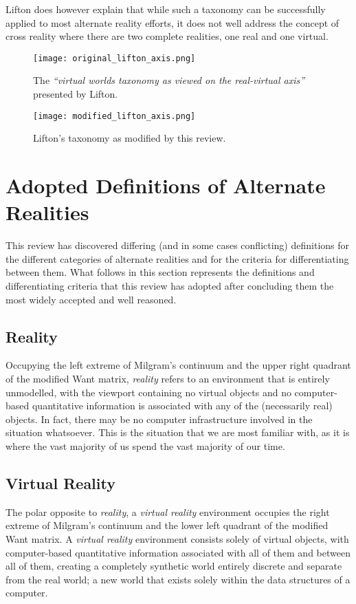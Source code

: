 Lifton does however explain that while such a taxonomy can be successfully applied to most alternate reality efforts, it does not well address the concept of cross reality where there are two complete realities, one real and one virtual.

\begin{figure}[h]
\centering
\texttt{[image: original\_lifton\_axis.png]}
\caption{The \textit{``virtual worlds taxonomy as viewed on the real-virtual axis''} presented by Lifton.}
\label{original_lifton_axis.png}
\end{figure}

\begin{figure}[h]
\centering
\texttt{[image: modified\_lifton\_axis.png]}
\caption{Lifton's taxonomy as modified by this review.}
\label{modified_lifton_axis.png}
\end{figure}

\section{Adopted Definitions of Alternate Realities}
\label{sec:definitions_of_alternate_realities}
This review has discovered differing (and in some cases conflicting) definitions for the different categories of alternate realities and for the criteria for differentiating between them. What follows in this section represents the definitions and differentiating criteria that this review has adopted after concluding them the most widely accepted and well reasoned.

\subsection{Reality}
Occupying the left extreme of Milgram's continuum and the upper right quadrant of the modified Want matrix, \textit{reality} refers to an environment that is entirely unmodelled, with the viewport containing no virtual objects and no computer-based quantitative information is associated with any of the (necessarily real) objects. In fact, there may be no computer infrastructure involved in the situation whatsoever. This is the situation that we are most familiar with, as it is where the vast majority of us spend the vast majority of our time.

\subsection{Virtual Reality}
The polar opposite to \textit{reality}, a \textit{virtual reality} environment occupies the right extreme of Milgram's continuum and the lower left quadrant of the modified Want matrix. A \textit{virtual reality} environment consists solely of virtual objects, with computer-based quantitative information associated with all of them and between all of them, creating a completely synthetic world entirely discrete and separate from the real world; a new world that exists solely within the data structures of a computer.%

